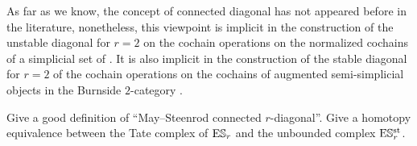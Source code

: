 \begin{example}
	As far as we know, the concept of connected diagonal has not appeared before in the literature, nonetheless, this viewpoint is implicit in the construction of the unstable diagonal for $r=2$ on the cochain operations on the normalized cochains of a simplicial set of \cite{medina2021fast_sq}.
	It is also implicit in the construction of the stable diagonal for $r=2$ of the cochain operations on the cochains of augmented semi-simplicial objects in the Burnside $2$-category \cite{cantero-moran2020khovanov}.
\end{example}

\begin{question}
	Give a good definition of ``May--Steenrod connected $r$-diagonal''.
	Give a homotopy equivalence between the Tate complex of $\mathrm{E}\mathbb{S}_r$ and the unbounded complex $\mathrm{E}\mathbb{S}^{\mathrm{st}}_r$.
\end{question}